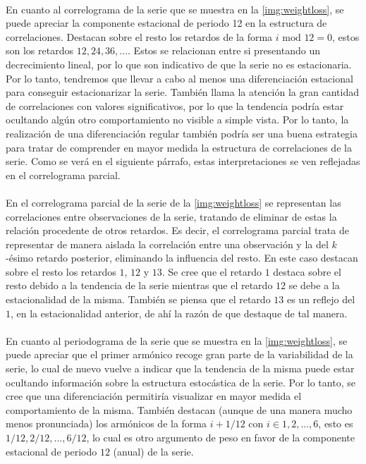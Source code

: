 \documentclass[a4paper, spanish]{article}
\begin{document}
      \paragraph{}
      En cuanto al correlograma de la serie que se muestra en la \autoref{img:weightloss}, se puede apreciar la componente estacional de periodo 12 en la estructura de correlaciones. Destacan sobre el resto los retardos de la forma $i \text{ mod } 12 = 0$, estos son los retardos $12, 24, 36,...$. Estos se relacionan entre si presentando un decrecimiento lineal, por lo que son indicativo de que la serie no es estacionaria. Por lo tanto, tendremos que llevar a cabo al menos una diferenciación estacional para conseguir estacionarizar la serie. También llama la atención la gran cantidad de correlaciones con valores significativos, por lo que la tendencia podría estar ocultando algún otro comportamiento no visible a simple vista. Por lo tanto, la realización de una diferenciación regular también podría ser una buena estrategia para tratar de comprender en mayor medida la estructura de correlaciones de la serie. Como se verá en el siguiente párrafo, estas interpretaciones se ven reflejadas en el correlograma parcial.

      \paragraph{}
      En el correlograma parcial de la serie de la \autoref{img:weightloss} se representan las correlaciones entre observaciones de la serie, tratando de eliminar de estas la relación procedente de otros retardos. Es decir, el correlograma parcial trata de representar de manera aislada la correlación entre una observación y la del $k$-ésimo retardo posterior, eliminando la influencia del resto. En este caso destacan sobre el resto los retardos $1$, $12$ y $13$. Se cree que el retardo $1$ destaca sobre el resto debido a la tendencia de la serie mientras que el retardo $12$ se debe a la estacionalidad de la misma. También se piensa que el retardo $13$ es un reflejo del $1$, en la estacionalidad anterior, de ahí la razón de que destaque de tal manera.

      \paragraph{}
      En cuanto al periodograma de la serie que se muestra en la \autoref{img:weightloss}, se puede apreciar que el primer armónico recoge gran parte de la variabilidad de la serie, lo cual de nuevo vuelve a indicar que la tendencia de la misma puede estar ocultando información sobre la estructura estocástica de la serie. Por lo tanto, se cree que una diferenciación permitiría visualizar en mayor medida el comportamiento de la misma. También destacan (aunque de una manera mucho menos pronunciada) los armónicos de la forma $i + 1 / 12$ con $i \in {1, 2, ..., 6}$, esto es $1/12, 2/12, ..., 6/12$, lo cual es otro argumento de peso en favor de la componente estacional de periodo $12$ (anual) de la serie.
\end{document}
